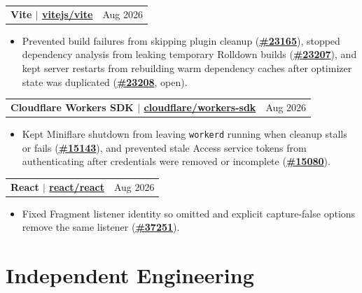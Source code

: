 \documentclass[letterpaper,11pt]{article}
\makeatletter
\newcommand{\resumeHeadingSimple}[2]{%
  \begin{tabularx}{\textwidth}{@{}Xr@{}}
    \textbf{#1} & #2
  \end{tabularx}\vspace{-0.25pt}
}
\newcommand{\resumeItemListStart}{\begin{itemize}[leftmargin=0.23in,itemsep=1.2pt,parsep=0pt,topsep=1.0pt]}
\newcommand{\resumeItem}[1]{\item\fontsize{10.6pt}{12.2pt}\selectfont #1}
\newcommand{\resumeItemListEnd}{\end{itemize}\vspace{-0.25pt}}
\makeatother
\begin{document}
\resumeHeadingSimple
  {Vite $|$ \href{https://redirect.github.com/vitejs/vite}{vitejs/vite}}
  {Aug 2026}
\resumeItemListStart
  \resumeItem{Prevented build failures from skipping plugin cleanup (\href{https://redirect.github.com/vitejs/vite/pull/23165}{\textbf{\#23165}}), stopped dependency analysis from leaking temporary Rolldown builds (\href{https://redirect.github.com/vitejs/vite/pull/23207}{\textbf{\#23207}}), and kept server restarts from rebuilding warm dependency caches after optimizer state was duplicated (\href{https://redirect.github.com/vitejs/vite/pull/23208}{\textbf{\#23208}}, open).}
\resumeItemListEnd

\resumeHeadingSimple
  {Cloudflare Workers SDK $|$ \href{https://redirect.github.com/cloudflare/workers-sdk}{cloudflare/workers-sdk}}
  {Aug 2026}
\resumeItemListStart
  \resumeItem{Kept Miniflare shutdown from leaving \texttt{workerd} running when cleanup stalls or fails (\href{https://redirect.github.com/cloudflare/workers-sdk/pull/15143}{\textbf{\#15143}}), and prevented stale Access service tokens from authenticating after credentials were removed or incomplete (\href{https://redirect.github.com/cloudflare/workers-sdk/pull/15080}{\textbf{\#15080}}).}
\resumeItemListEnd

\resumeHeadingSimple
  {React $|$ \href{https://redirect.github.com/react/react}{react/react}}
  {Aug 2026}
\resumeItemListStart
  \resumeItem{Fixed Fragment listener identity so omitted and explicit capture-false options remove the same listener (\href{https://redirect.github.com/react/react/pull/37251}{\textbf{\#37251}}).}
\resumeItemListEnd

\section{Independent Engineering}
\end{document}
